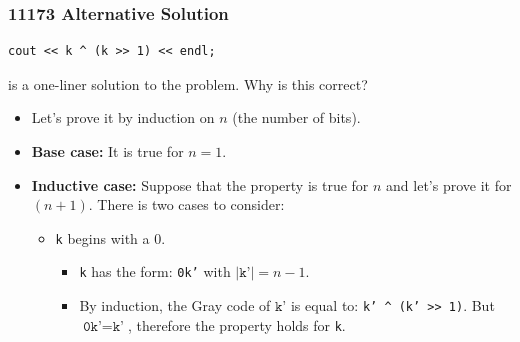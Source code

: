 \documentclass{beamer}
\begin{document}
\begin{frame}[fragile]
\frametitle{11173 Alternative Solution}

\footnotesize

\begin{lstlisting}
cout << k ^ (k >> 1) << endl;
\end{lstlisting}

is a one-liner solution to the problem. Why is this correct?

\begin{itemize}

\item<2-> Let's prove it by induction on $n$ (the number of bits).

\item<3-> \textbf{Base case:} It is true for $n = 1$.

\item<4-> \textbf{Inductive case:} Suppose that the property is true for $n$ and let's prove it for $(n + 1)$. There is two cases to consider:
\begin{itemize}
\footnotesize
\item<5-> \texttt{k} begins with a $0$.
\begin{itemize}
\footnotesize
\item<6-> \texttt{k} has the form: \texttt{0k'} with $|\texttt{k'}| = n - 1$.

\vspace{0.15cm}

\item<7-> By induction, the Gray code of $\texttt{k'}$ is equal to: \texttt{k' \textasciicircum\ (k' >> 1)}. But $\texttt{0k'} = \texttt{k'}$, therefore
the property holds for \texttt{k}.

\end{itemize}

\end{itemize}

\end{itemize}

\end{frame}
\end{document}
